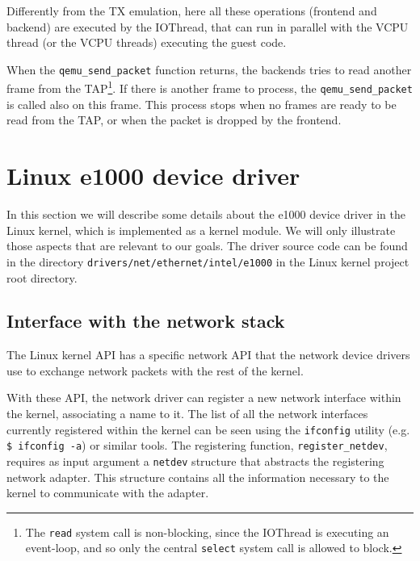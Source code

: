Differently from the TX emulation, here all these operations (frontend and backend) are executed by the IOThread, that can run in parallel
with the VCPU thread (or the VCPU threads) executing the guest code.

\vspace{0.5cm}

When the \texttt{qemu\_send\_packet} function returns, the backends tries to read another frame from the TAP\footnote{The \texttt{read}
system call is non-blocking, since the IOThread is executing an event-loop, and so only the central \texttt{select} system call is
allowed to block.}. If there is another frame to process, the \texttt{qemu\_send\_packet} is called also on this frame.
This process stops when no frames are ready to be read from the TAP, or when the packet is dropped by the frontend.



\section{Linux e1000 device driver}
\label{sec:e1000driver}
In this section we will describe some details about the e1000 device driver in the Linux kernel, which is implemented as
a kernel module.
We will only illustrate those aspects that are relevant to our goals.
The driver source code can be found in the directory \texttt{drivers/net/ethernet/intel/e1000} in the Linux kernel project root directory.

\subsection{Interface with the network stack}
\label{sec:netapi}
The Linux kernel API has a specific network API that the network device drivers use to exchange network packets with
the rest of the kernel.

With these API, the network driver can register a new network interface within the kernel, associating a name to it.
The list of all the network interfaces currently registered within the kernel can be seen using the \texttt{ifconfig} utility
(e.g. \texttt{\$ ifconfig -a}) or similar tools.
The registering function, \texttt{register\_netdev}, requires as input argument a \texttt{netdev} structure that abstracts the
registering network adapter. This structure contains all the information necessary to the kernel to communicate with the adapter.

\vspace{0.5cm}

